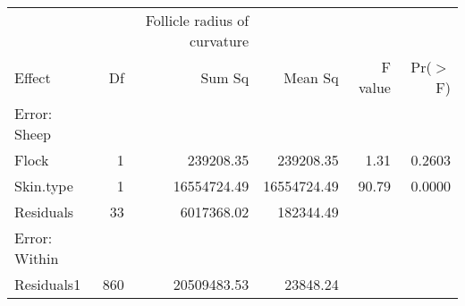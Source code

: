 \begin{table}[ht]
\begin{tabular}{lrrrrr}
 & & Follicle radius of curvature & & & \\
 Effect & Df & Sum Sq & Mean Sq & F value & Pr($>$F) \\ 
  \hline
  Error: Sheep & & & &  & \\
Flock     & 1 & 239208.35 & 239208.35 & 1.31 & 0.2603 \\ 
  Skin.type & 1 & 16554724.49 & 16554724.49 & 90.79 & 0.0000 \\ 
  Residuals & 33 & 6017368.02 & 182344.49 &  &  \\ 
  Error: Within & & & & &  \\
  Residuals1 & 860 & 20509483.53 & 23848.24 &  &  \\ 
   \hline
\end{tabular}
\end{table}
